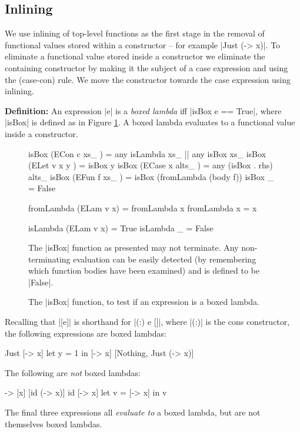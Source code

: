 \documentclass{sigplanconf}
\newenvironment{definition}
    {\smallskip
     \noindent\textbf{Definition:}}
    {\noexample}
\begin{document}
\subsection{Inlining}
\label{sec:inlining}

We use inlining of top-level functions as the first stage in the removal of functional values stored within a constructor -- for example |Just (\x -> x)|. To eliminate a functional value stored inside a constructor we eliminate the containing constructor by making it the subject of a case expression and using the (case-con) rule. We move the constructor towards the case expression using inlining.

\begin{definition}
An expression |e| is a \textit{boxed lambda} iff |isBox e == True|, where |isBox| is defined as in Figure \ref{fig:boxed_lambda}. A boxed lambda evaluates to a functional value inside a constructor.
\end{definition}

\begin{figure}
\begin{code}
isBox (ECon c xs_     )  =  any isLambda xs_ ||  any isBox xs_
isBox (ELet v x y     )  =  isBox y
isBox (ECase x alts_  )  =  any (isBox . rhs) alts_
isBox (EFun f xs_     )  =  isBox (fromLambda (body f))
isBox _                  =  False

fromLambda (ELam v x)    = fromLambda x
fromLambda x             = x

isLambda (ELam v x)      = True
isLambda _               = False
\end{code}

The |isBox| function as presented may not terminate. Any non-terminating evaluation can be easily detected (by remembering which function bodies have been examined) and is defined to be |False|.
\caption{The |isBox| function, to test if an expression is a boxed lambda.}
\label{fig:boxed_lambda}
\end{figure}

\begin{example}
Recalling that |[e]| is shorthand for |(:) e []|, where |(:)| is the cons constructor, the following expressions are boxed lambdas:

\ignore\begin{code}
[\x -> x]
Just [\x -> x]
let y = 1 in [\x -> x]
[Nothing, Just (\x -> x)]
\end{code}

\noindent The following are \textit{not} boxed lambdas:

\ignore\begin{code}
\x -> [x]
[id (\x -> x)]
id [\x -> x]
let v = [\x -> x] in v
\end{code}

The final three expressions all \textit{evaluate to} a boxed lambda, but are not themselves boxed lambdas.
\end{example}
\end{document}

